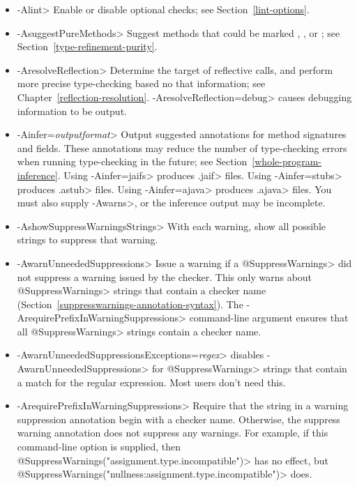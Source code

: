 \begin{itemize}
\item \<-Alint>
  Enable or disable optional checks; see Section~\ref{lint-options}.
\item \<-AsuggestPureMethods>
  Suggest methods that could be marked
  ,
  ,
  or ; see
  Section~\ref{type-refinement-purity}.
\item \<-AresolveReflection>
  Determine the target of reflective calls, and perform more precise
  type-checking based no that information; see
  Chapter~\ref{reflection-resolution}.  \<-AresolveReflection=debug> causes
  debugging information to be output.
\item \<-Ainfer=\emph{outputformat}>
  Output suggested annotations for method signatures and fields.
  These annotations may reduce the number of type-checking
  errors when running type-checking in the future; see
  Section~\ref{whole-program-inference}.
  Using \<-Ainfer=jaifs> produces \<.jaif> files.
  Using \<-Ainfer=stubs> produces \<.astub> files.
  Using \<-Ainfer=ajava> produces \<.ajava> files.
  You must also supply \<-Awarns>, or the inference output may be incomplete.
\item \<-AshowSuppressWarningsStrings>
  With each warning, show all possible strings to suppress that warning.
\item \<-AwarnUnneededSuppressions>
  Issue a warning if a \<@SuppressWarnings> did not suppress a warning
  issued by the checker.  This only warns about
  \<@SuppressWarnings> strings that contain a checker name
  (Section~\ref{suppresswarnings-annotation-syntax}).  The
  \<-ArequirePrefixInWarningSuppressions> command-line argument ensures
  that all \<@SuppressWarnings> strings contain a checker name.
\item \<-AwarnUnneededSuppressionsExceptions=\emph{regex}> disables
  \<-AwarnUnneededSuppressions> for \<@SuppressWarnings> strings that
  contain a match for the regular expression.  Most users don't need this.
\item \<-ArequirePrefixInWarningSuppressions>
  Require that the string in a warning suppression annotation begin with a checker
  name.  Otherwise, the suppress warning annotation does not
  suppress any warnings.  For example, if this command-line option is
  supplied, then \<@SuppressWarnings("assignment.type.incompatible")> has no effect, but
  \<@SuppressWarnings("nullness:assignment.type.incompatible")> does.
\end{itemize}

